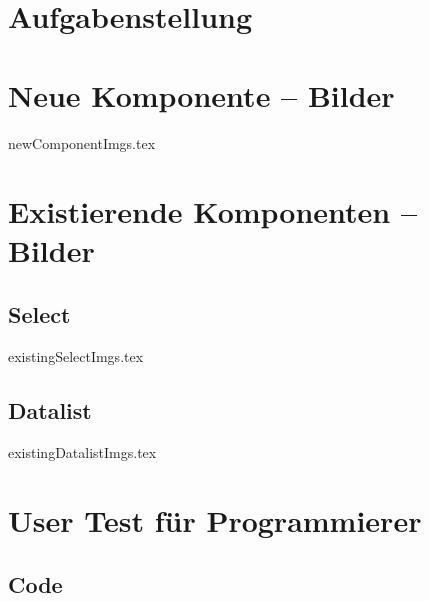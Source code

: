 \chapter{Aufgabenstellung}
\label{chap:task}





\chapter{Neue Komponente – Bilder}
\label{chap:newImgs}

\graphicspath{ {./img/newComponent/} }
{newComponentImgs.tex}
\graphicspath{ {./img/} }



\chapter{Existierende Komponenten – Bilder}
\label{chap:existingImgs}


\section*{Select}
\graphicspath{ {./img/select/} }
{existingSelectImgs.tex}
\graphicspath{ {./img/} }

\clearpage
\section*{Datalist}
\graphicspath{ {./img/datalist/} }
{existingDatalistImgs.tex}
\graphicspath{ {./img/} }



\chapter{User Test für Programmierer}
\label{chap:userTestProgrammers}


\section*{Code}


